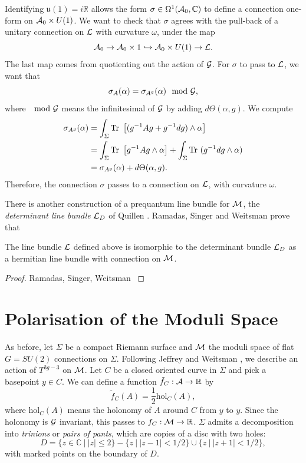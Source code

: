 Identifying $\mathfrak{u}(1)=i\mathbb{R}$ allows the form $\sigma\in \Omega^1(\mathcal{A}_0,\mathbb{C})$ to define a connection one-form on $\mathcal{A}_0 \times U(1)$. We want to check that $\sigma$ agrees with the pull-back of a unitary connection on $\mathcal{L}$ with curvature $\omega$, under the map
\begin{equation}
\mathcal{A}_0 \to \mathcal{A}_0 \times 1 \hookrightarrow \mathcal{A}_0 \times U(1) \to \mathcal{L}.
\end{equation}
The last map comes from quotienting out the action of $\mathcal{G}$. For $\sigma$ to pass to $\mathcal{L}$, we want that
\begin{equation}
\sigma_A(\alpha) = \sigma_{A^g}(\alpha) \mod {\mathcal{G}},
\end{equation}
where $\mod {\mathcal{G}}$ means the infinitesimal of $\mathcal{G}$ by adding $d\Theta(\alpha,g)$. We compute
\begin{align*}
\sigma_{A^g}(\alpha) &= \int_\Sigma \text{Tr }\left[(g^{-1}Ag+g^{-1}dg)\wedge \alpha\right]\\
&= \int_\Sigma \text{Tr }\left[g^{-1}Ag \wedge \alpha\right] + \int_\Sigma \text{Tr }(g^{-1}dg \wedge \alpha)\\
&= \sigma_{A^g}(\alpha) + d\Theta(\alpha,g).
\end{align*}
Therefore, the connection $\sigma$ passes to a connection on $\mathcal{L}$, with curvature $\omega$. 

There is another construction of a prequantum line bundle for $\mathcal{M}$, the \textit{determinant line bundle} $\mathcal{L}_D$ of Quillen \cite{quillen_determinants_1985}. Ramadas, Singer and Weitsman prove that
\begin{theorem}
	\label{t:cs=det}
	The line bundle $\mathcal{L}$ defined above is isomorphic to the determinant bundle $\mathcal{L}_D$ as a hermitian line bundle with connection on $\mathcal{M}$.
\end{theorem}
\begin{proof}
	Ramadas, Singer, Weitsman \cite[Theorem 2]{ramadas_comments_1989}
\end{proof}	
	
	
\section{Polarisation of the Moduli Space}	
	As before, let $\Sigma$ be a compact Riemann surface and $\mathcal{M}$ the moduli space of flat $G=SU(2)$ connections on $\Sigma$. Following Jeffrey and Weitsman \cite{jeffrey_bohr-sommerfeld_1992}, we describe an action of $T^{3g-3}$ on $\mathcal{M}$. Let $C$ be a closed oriented curve in $\Sigma$ and pick a basepoint $y\in C$. We can define a function $\tilde{f}_C:\mathcal{A} \to \mathbb{R}$ by 
	\begin{equation}
		\tilde{f}_C(A) = \frac{1}{2}\text{hol}_C(A),
	\end{equation}
	where hol$_C(A)$ means the holonomy of $A$ around $C$ from $y$ to $y$. Since the holonomy is $\mathcal{G}$ invariant, this passes to $f_C:\mathcal{M} \to \mathbb{R}$. $\Sigma$ admits a decomposition into \textit{trinions} or \textit{pairs of pants}, which are copies of a disc with two holes:
	\begin{equation}
		D = \{z \in \mathbb{C}~|~ |z|\leq 2 \} - \{z~|~|z-1|<1/2\}\cup \{z~|~ |z+1| < 1/2\},
	\end{equation}
	with marked points on the boundary of $D$. 

